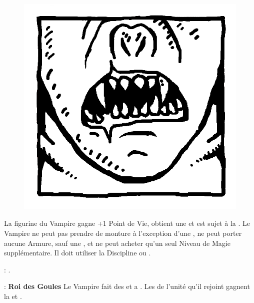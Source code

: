 
\begin{figure}
\centering
\includegraphics[width=\logosize]{logos/logo_strigoi.png}
\end{figure}
La figurine du Vampire gagne +1 Point de Vie, obtient une  et est sujet à la \hatred{}. Le Vampire ne peut pas prendre de monture à l'exception d'une \shriekinghorror{}, ne peut porter aucune Armure, sauf une \mountsprotection{}, et ne peut acheter qu'un seul Niveau de Magie supplémentaire. Il doit utiliser la Discipline \wilderness{} ou \necromancy{}.

\vspace{0.5cm}
\bloodties{} : \textbf{\ghouls{}}.

\vspace{0.5cm}
\ancientbloodpower{} : \textbf{Roi des Goules}\dotfill{}\newline%
Le Vampire fait des \poisonedattacks{} et a . Les \ghouls{} de l'unité qu'il rejoint gagnent la \hatred{} et .


